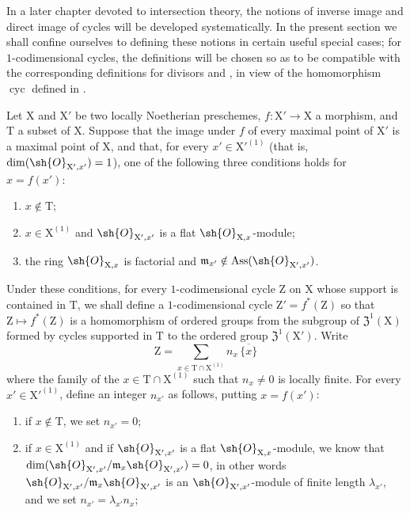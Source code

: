 In a later chapter devoted to intersection theory, the notions of inverse image and direct image of cycles will be developed systematically.
In the present section we shall confine ourselves to defining these notions in certain useful special cases; for $1$-codimensional cycles, the definitions will be chosen so as to be compatible with the corresponding definitions for divisors  and , in view of the homomorphism $\operatorname{cyc}$ defined in .

\begin{env}[21.10.1]
\label{IV.21.10.1}
\enlargethispage{2pt}
Let $\mathrm{X}$ and $\mathrm{X}'$ be two locally Noetherian preschemes, $f:\mathrm{X}'\to\mathrm{X}$ a morphism, and $\mathrm{T}$ a subset of $\mathrm{X}$.
Suppose that the image under $f$ of every maximal point of $\mathrm{X}'$ is a maximal point of $\mathrm{X}$, and that, for every $x'\in\mathrm{X}'^{(1)}$ (that is, $\dim(\sh{O}_{\mathrm{X}',x'})=1$), one of the following three conditions holds for $x=f(x')$:
\begin{enumerate}[label=(\roman*)]
  \item $x\notin\mathrm{T}$;
  \item $x\in\mathrm{X}^{(1)}$ and $\sh{O}_{\mathrm{X}',x'}$ is a flat $\sh{O}_{\mathrm{X},x}$-module;
  \item the ring $\sh{O}_{\mathrm{X},x}$ is factorial and $\mathfrak{m}_{x'}\notin\operatorname{Ass}(\sh{O}_{\mathrm{X}',x'})$.
\end{enumerate}
Under these conditions, for every $1$-codimensional cycle $\mathrm{Z}$ on $\mathrm{X}$ whose support is contained in $\mathrm{T}$, we shall define a $1$-codimensional cycle $\mathrm{Z}'=f^*(\mathrm{Z})$ so that $\mathrm{Z}\mapsto f^*(\mathrm{Z})$ is a homomorphism of ordered groups from the subgroup of $\mathfrak{Z}^1(\mathrm{X})$ formed by cycles supported in $\mathrm{T}$ to the ordered group $\mathfrak{Z}^1(\mathrm{X}')$.
Write
\[
\label{IV.21.10.1.1}
  \mathrm{Z} = \sum_{x\in\mathrm{T}\cap\mathrm{X}^{(1)}} n_x\,\overline{\{x\}}
  \tag{21.10.1.1}
\]
where the family of the $x\in\mathrm{T}\cap\mathrm{X}^{(1)}$ such that $n_x\neq 0$ is locally finite.
For every $x'\in\mathrm{X}'^{(1)}$, define an integer $n_{x'}$ as follows, putting $x=f(x')$:
\begin{enumerate}[label=\arabic*\textsuperscript{o}]
  \item if $x\notin\mathrm{T}$, we set $n_{x'}=0$;
  \item if $x\in\mathrm{X}^{(1)}$ and if $\sh{O}_{\mathrm{X}',x'}$ is a flat $\sh{O}_{\mathrm{X},x}$-module, we know  that $\dim(\sh{O}_{\mathrm{X}',x'}/\mathfrak{m}_x\sh{O}_{\mathrm{X}',x'})=0$, in other words $\sh{O}_{\mathrm{X}',x'}/\mathfrak{m}_x\sh{O}_{\mathrm{X}',x'}$ is an $\sh{O}_{\mathrm{X}',x'}$-module of finite length $\lambda_{x'}$, and we set $n_{x'}=\lambda_{x'}n_x$;

\end{enumerate}
\end{env}
